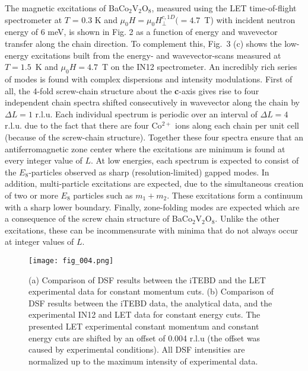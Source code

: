 \documentclass[aps,prl,twocolumn,superscriptaddress,groupedaddress]{revtex4}
\begin{document}
The magnetic excitations of BaCo$_2$V$_2$O$_8$, measured using the LET time-of-flight spectrometer at $T$ = 0.3 K and $\mu_0 H = \mu_0 H_{\bot}^{c,1D}( = 4.7$~T) with incident neutron energy of 6 meV, is shown in Fig. 2 as a function of energy and wavevector transfer along the chain direction. To complement this, Fig.\ 3 (c) shows the low-energy excitations built from the energy- and wavevector-scans measured at $T=1.5$~K and $\mu_0 H = 4.7$~T on the IN12 spectrometer. An incredibly rich series of modes is found with complex dispersions and intensity modulations. First of all, the 4-fold screw-chain structure about the \textbf{c}-axis gives rise to four independent chain spectra shifted consecutively in wavevector along the chain by $\Delta L = 1$ r.l.u. Each individual spectrum is periodic over an interval of $\Delta L = 4$ r.l.u. due to the fact that there are four Co$^{2+}$ ions along each chain per unit cell (because of the screw-chain structure). Together these four spectra ensure that an antiferromagnetic zone center where the excitations are minimum is found at every integer value of $L$. At low energies, each spectrum is expected to consist of the $E_8$-particles observed as sharp (resolution-limited) gapped modes. In addition, multi-particle excitations are expected, due to the simultaneous creation of two or more $E_8$ particles such as $m_1+m_2$. These excitations form a continuum with a sharp lower boundary. Finally, zone-folding modes are expected which are a consequence of the screw chain structure of BaCo$_2$V$_2$O$_8$. Unlike the other excitations, these can be incommensurate with minima that do not always occur at integer values of $L$.



\begin{figure*}
\texttt{[image: fig\_004.png]}
\caption{(a) Comparison of DSF results between the iTEBD and the LET experimental data for constant momentum cuts. (b) Comparison of DSF results between the iTEBD data, the analytical data, and the experimental IN12 and LET data for constant energy cuts. The presented LET experimental constant momentum and constant energy cuts are shifted by an offset of 0.004 r.l.u (the offset was caused by experimental conditions). All DSF intensities are normalized up to the maximum intensity of experimental data.}
\label{fig:scans}
\end{figure*}
\end{document}
